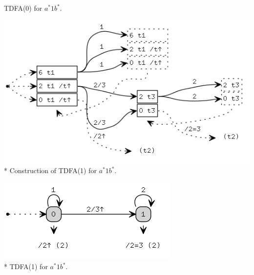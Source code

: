 \documentclass{article}
\theoremstyle{definition}
\begin{document}
\begin{multicols}{2}
\begin{center}
\footnotesize{TDFA(0) for $a^* 1 b^*$.} \\
\end{center}
\begin{center}
\includegraphics[width=0.8\linewidth]{img/example1/tdfa1_raw.png}\\*
\footnotesize{Construction of TDFA(1) for $a^* 1 b^*$.} \\
\end{center}
\begin{center}
\includegraphics[width=0.6\linewidth]{img/example1/tdfa1.png}\\*
\footnotesize{TDFA(1) for $a^* 1 b^*$.} \\
\end{center}


\end{multicols}
\end{document}
